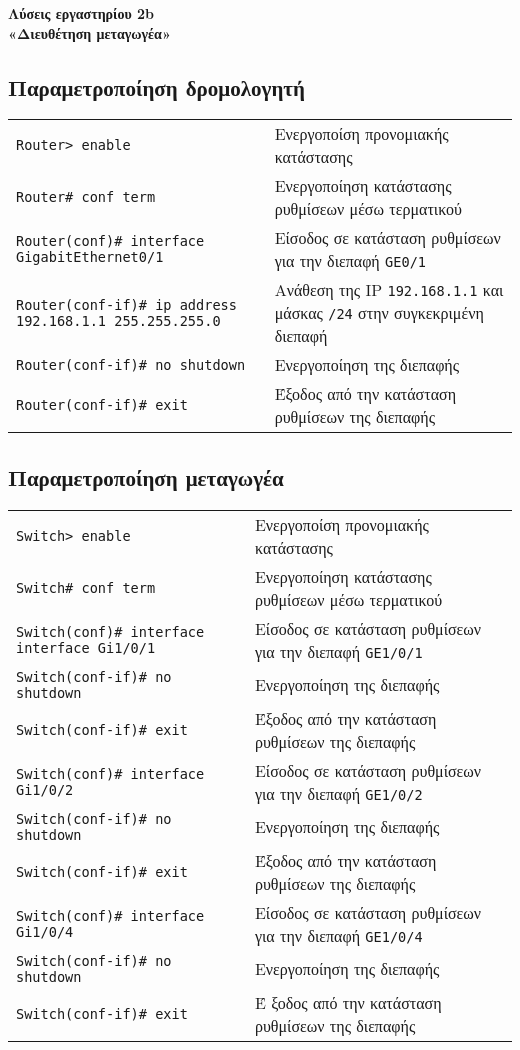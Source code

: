 \documentclass[12pt]{article}
\begin{document}
	
\noindent\textbf{\Large Λύσεις εργαστηρίου 2b\\
«Διευθέτηση μεταγωγέα»}

\hrulefill


\subsection*{Παραμετροποίηση δρομολογητή}
\begin{tabular}{m{12cm}m{7cm}}
	\texttt{Router> enable} & Ενεργοποίση προνομιακής κατάστασης\\[0.25cm]
	\texttt{Router\# conf term} & Ενεργοποίηση κατάστασης ρυθμίσεων μέσω τερματικού\\[0.25cm]
	\texttt{Router(conf)\# interface GigabitEthernet0/1} & Είσοδος σε κατάσταση ρυθμίσεων για την διεπαφή \texttt{GE0/1}\\[0.25cm]
	\texttt{Router(conf-if)\# ip address 192.168.1.1 255.255.255.0} & Ανάθεση της IP \texttt{192.168.1.1} και μάσκας \texttt{/24} στην συγκεκριμένη διεπαφή\\[0.25cm]
	\texttt{Router(conf-if)\# no shutdown} & Ενεργοποίηση της διεπαφής\\[0.25cm]
	\texttt{Router(conf-if)\# exit} & Έξοδος από την κατάσταση ρυθμίσεων της διεπαφής\\[0.25cm]
\end{tabular}

\subsection*{Παραμετροποίηση μεταγωγέα}
\begin{tabular}{m{9cm}m{10cm}}
	\texttt{Switch> enable} &Ενεργοποίση προνομιακής κατάστασης \\[0.25cm]
	\texttt{Switch\# conf term} & Ενεργοποίηση κατάστασης ρυθμίσεων μέσω τερματικού\\[0.25cm]
	\texttt{Switch(conf)\# interface interface Gi1/0/1} & Είσοδος σε κατάσταση ρυθμίσεων για την διεπαφή \texttt{GE1/0/1}\\[0.25cm]
	\texttt{Switch(conf-if)\# no shutdown} & Ενεργοποίηση της διεπαφής\\[0.25cm]
	\texttt{Switch(conf-if)\# exit} &Έξοδος από την κατάσταση ρυθμίσεων της διεπαφής\\[0.25cm]
	\texttt{Switch(conf)\# interface Gi1/0/2} & Είσοδος σε κατάσταση ρυθμίσεων για την διεπαφή \texttt{GE1/0/2} \\[0.25cm]
	\texttt{Switch(conf-if)\# no shutdown} & Ενεργοποίηση της διεπαφής\\[0.25cm]
	\texttt{Switch(conf-if)\# exit} & Έξοδος από την κατάσταση ρυθμίσεων της διεπαφής\\[0.25cm]
	\texttt{Switch(conf)\# interface Gi1/0/4} & Είσοδος σε κατάσταση ρυθμίσεων για την διεπαφή \texttt{GE1/0/4} \\[0.25cm]
	\texttt{Switch(conf-if)\# no shutdown} & Ενεργοποίηση της διεπαφής\\[0.25cm]
	\texttt{Switch(conf-if)\# exit} &Έ ξοδος από την κατάσταση ρυθμίσεων της διεπαφής
\end{tabular}
\end{document}
